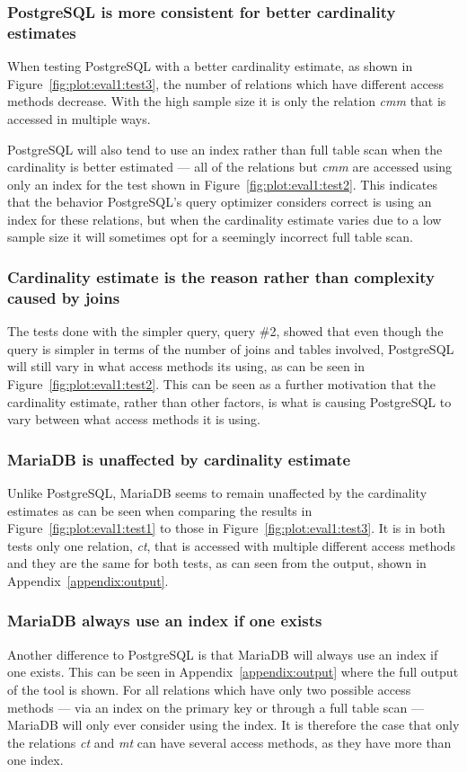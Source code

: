 \subsubsection{PostgreSQL is more consistent for better cardinality estimates}
When testing PostgreSQL with a better cardinality estimate, as shown in
Figure~\ref{fig:plot:eval1:test3}, the number of relations which have different
access methods decrease. With the high sample size it is only the relation
\textit{cmm} that is accessed in multiple ways.

PostgreSQL will also tend to use an index rather than full table scan when the
cardinality is better estimated --- all of the relations but \textit{cmm} are
accessed using only an index for the test shown in
Figure~\ref{fig:plot:eval1:test2}. This indicates that the behavior PostgreSQL's
query optimizer considers correct is using an index for these relations, but
when the cardinality estimate varies due to a low sample size it will sometimes
opt for a seemingly incorrect full table scan.

\subsubsection{Cardinality estimate is the reason rather than complexity caused
  by joins}
The tests done with the simpler query, query \#2, showed that even though the
query is simpler in terms of the number of joins and tables involved, PostgreSQL
will still vary in what access methods its using, as can be seen in
Figure~\ref{fig:plot:eval1:test2}. This can be seen as a further motivation that
the cardinality estimate, rather than other factors, is what is causing
PostgreSQL to vary between what access methods it is using.

\subsubsection{MariaDB is unaffected by cardinality estimate}
Unlike PostgreSQL, MariaDB seems to remain unaffected by the cardinality
estimates as can be seen when comparing the results in
Figure~\ref{fig:plot:eval1:test1} to those in Figure~\ref{fig:plot:eval1:test3}.
It is in both tests only one relation, \textit{ct}, that is accessed with
multiple different access methods and they are the same for both tests, as can
seen from the output, shown in Appendix~\ref{appendix:output}.


\subsubsection{MariaDB always use an index if one exists}
Another difference to PostgreSQL is that MariaDB will always use an index if one
exists. This can be seen in Appendix~\ref{appendix:output} where the full output
of the tool is shown. For all relations which have only two possible access
methods --- via an index on the primary key or through a full table scan ---
MariaDB will only ever consider using the index. It is therefore the case
that only the relations \textit{ct} and \textit{mt} can have several access
methods, as they have more than one index.

